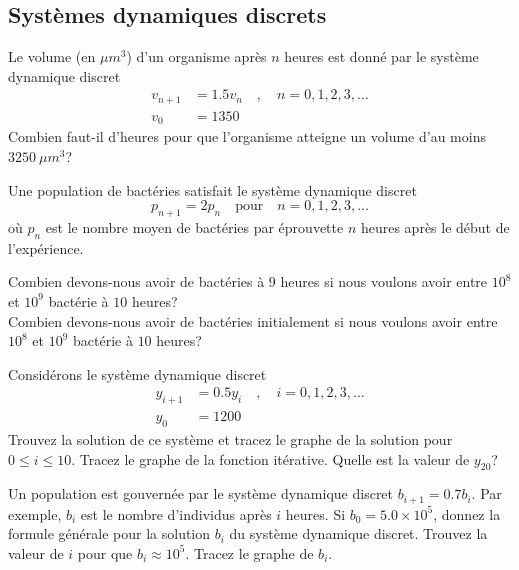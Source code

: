 \subsection{Systèmes dynamiques discrets}

\begin{question}[\life]
Le volume (en $\mu m^3$) d'un organisme après $n$ heures est donné par le
système dynamique discret
\begin{align*}
v_{n+1} &= 1.5 v_n \quad , \quad n=0, 1, 2, 3, \ldots \\
v_0 &= 1350
\end{align*}
Combien faut-il d'heures pour que l'organisme atteigne un volume d'au moins
$3250\ \mu m^3$?
\label{6Q70}
\end{question}

\begin{question}[\life]
Une population de bactéries satisfait le système dynamique discret
\[
p_{n+1} = 2 p_n \quad \text{pour} \quad n=0, 1, 2, 3, \ldots
\]
où $p_n$ est le nombre moyen de bactéries par éprouvette $n$ heures
après le début de l'expérience.

 Combien devons-nous avoir de bactéries à $9$ heures si nous
voulons avoir entre $10^8$ et $10^9$ bactérie à $10$ heures?\\
 Combien devons-nous avoir de bactéries initialement si nous
voulons avoir entre $10^8$ et $10^9$ bactérie à $10$ heures?
\label{6Q71}
\end{question}

\begin{question}[\life]
Considérons le système dynamique discret
\begin{align*}
y_{i+1} &= 0.5 y_i \quad , \quad i=0, 1, 2, 3, \ldots \\
y_0 &= 1200
\end{align*}
Trouvez la solution de ce système et tracez le graphe de la solution pour
$0 \leq i \leq 10$.  Tracez le graphe de la fonction itérative.
Quelle est la valeur de $y_{20}$?
\label{6Q72}
\end{question}

\begin{question}[\life]
Un population est gouvernée par le système dynamique discret
$b_{i+1} = 0.7 b_i$.  Par exemple, $b_i$ est le nombre d'individus
après $i$ heures.  Si $b_0 = 5.0 \times 10^5$, donnez la formule
générale pour la solution $b_i$ du système dynamique discret.  Trouvez
la valeur de $i$ pour que $b_i \approx 10^5$.  Tracez le graphe de $b_i$.
\label{6Q73}
\end{question}

